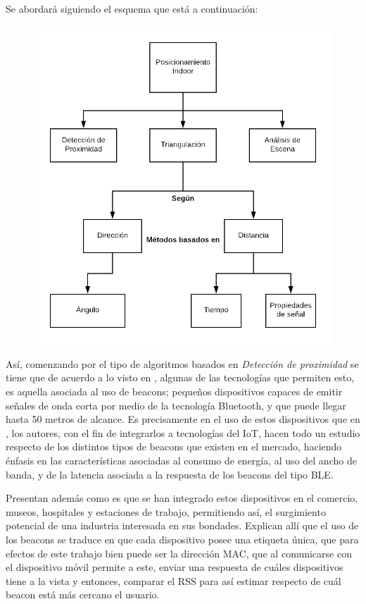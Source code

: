 Se abordará siguiendo el esquema que está a continuación:
\begin{figure}[h!]
    \centering
    \includegraphics[scale = 0.3]{./images/diagrama}
    \label{fig:diagrama}
\end{figure}

Así, comenzando por el tipo de algoritmos basados en \textit{Detección de proximidad} se tiene que de acuerdo a lo visto en \cite{6}, algunas de las tecnologías que permiten esto, es aquella asociada al uso de beacons; pequeños dispositivos capaces de emitir señales de onda corta por medio de la tecnología Bluetooth, y que puede llegar hasta 50 metros de alcance. Es precisamente en el uso de estos dispositivos que en \cite{20}, los autores, con el fin de integrarlos a tecnologías del IoT, hacen todo un estudio respecto de los distintos tipos de beacons que existen en el mercado, haciendo énfasis en las características asociadas al consumo de energía, al uso del ancho de banda, y de la latencia asociada a la respuesta de los beacons del tipo \ac{BLE}.

Presentan además como es que se han integrado estos dispositivos en el comercio, museos, hospitales y estaciones de trabajo, permitiendo así, el surgimiento potencial de una industria interesada en sus bondades. Explican allí que el uso de los beacons se traduce en que cada dispositivo posee una etiqueta única, que para efectos de este trabajo bien puede ser la dirección \ac{MAC}, que al comunicarse con el dispositivo móvil permite a este, enviar una respuesta de cuáles dispositivos tiene a la vista y entonces, comparar el \ac{RSS} para así estimar respecto de cuál beacon está más cercano el usuario.

